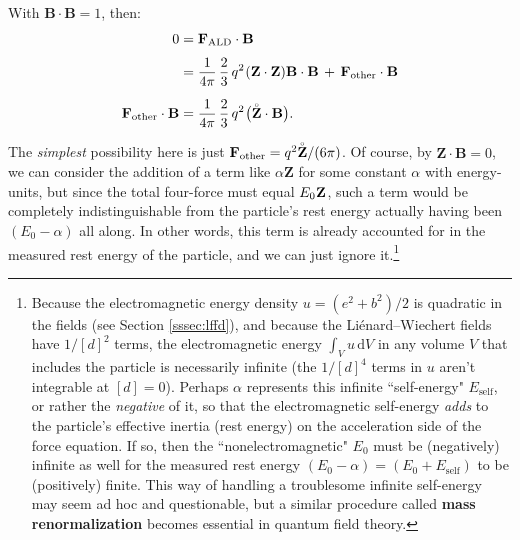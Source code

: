 \documentclass[12pt]{article}
\renewcommand{\mathring}[1]{\accentset{\circ}{#1}}
\renewcommand{\vv}[1]{\mathbf{#1}}
\newcommand{\dd}[1]{\mathrm{d}#1}
\begin{document}
With $\vv B \cdot \vv B = 1$, then:
\begin{equation*}
\begin{aligned}
0 &= \vv F_{\textrm{ALD}} \cdot \vv B \\[3pt]
&= \dfrac{1}{4 \pi} \, \dfrac{2}{3} \, q^2 \mkern1mu ( \vv Z \cdot \vv Z ) \vv B \cdot \vv B \, + \, \vv F_{\textrm{other}} \cdot \vv B \\[6pt]
\vv F_{\textrm{other}} \cdot \vv B &= \dfrac{1}{4 \pi} \, \dfrac{2}{3} \, q^2 \mkern1mu \big( \mathring{\vv Z} \cdot \vv B \big) .
\end{aligned}
\end{equation*}

The \emph{simplest} possibility here is just $\vv F_{\textrm{other}} = q^2 \mathring{\vv Z} / (6 \pi)$. Of course, by ${\vv Z \cdot \vv B = 0}$, we can consider the addition of a term like $\alpha \vv Z$ for some constant $\alpha$ with energy-units, but since the total four-force must equal $E_0 \mkern.5mu \vv Z$, such a term would be completely indistinguishable from the particle's rest energy actually having been $(E_0 - \alpha)$ all along. In other words, this term is already accounted for in the measured rest energy of the particle, and we can just ignore it.\footnote{\label{fn:renormalization}Because the electromagnetic energy density $u = (e^2 + b^2)/2$ is quadratic in the fields (see Section \ref{sssec:lffd}), and because the Li\'enard--Wiechert fields have $1/[d]^2$ terms, the electromagnetic energy $\int_V u \, \dd V$ in any volume $V$ that includes the particle is necessarily infinite (the $1/[d]^4$ terms in $u$ aren't integrable at $[d] = 0$). Perhaps $\alpha$ represents this infinite ``self-energy" $E_{\mathrm{self}}$, or rather the \emph{negative} of it, so that the electromagnetic self-energy \emph{adds} to the particle's effective inertia (rest energy) on the acceleration side of the force equation. If so, then the ``nonelectromagnetic" $E_0$ must be (negatively) infinite as well for the measured rest energy $(E_0 - \alpha) = (E_0 + E_{\mathrm{self}})$ to be (positively) finite. This way of handling a troublesome infinite self-energy may seem ad hoc and questionable, but a similar procedure called \textbf{mass renormalization} becomes essential in quantum field theory.}
\end{document}
